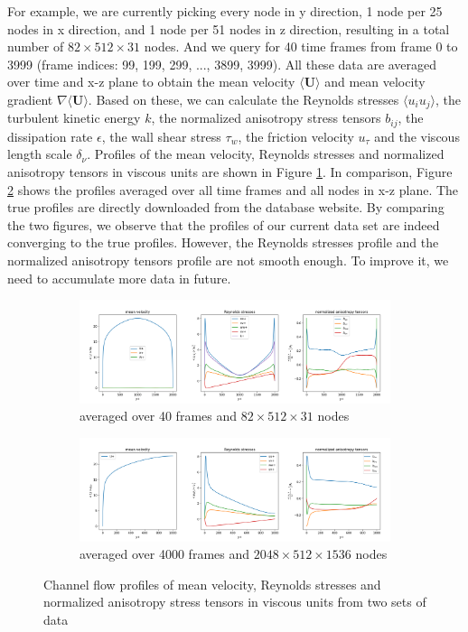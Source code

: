 \documentclass{article}
\numberwithin{equation}{section}
\begin{document}
For example, we are currently picking every node in y direction, 1 node per 25 nodes in x direction, and 1 node per 51 nodes in z direction, resulting in a total number of $82\times512\times31$ nodes. And we query for 40 time frames from frame 0 to 3999 (frame indices: 99, 199, 299, ..., 3899, 3999). All these data are averaged over time and x-z plane to obtain the mean velocity $\langle\mathbf{U}\rangle$ and mean velocity gradient $\nabla\langle\mathbf{U}\rangle$. Based on these, we can calculate the Reynolds stresses $\langle u_i u_j\rangle$, the turbulent kinetic energy $k$, the normalized anisotropy stress tensors $b_{ij}$, the dissipation rate $\epsilon$, the wall shear stress $\tau_w$, the friction velocity $u_{\tau}$ and the viscous length scale $\delta_{\nu}$. Profiles of the mean velocity, Reynolds stresses and normalized anisotropy tensors in viscous units are shown in Figure \ref{fig:profiles_40}. In comparison, Figure \ref{fig:profiles_all} shows the profiles averaged over all time frames and all nodes in x-z plane. The true profiles are directly downloaded from the database website. By comparing the two figures, we observe that the profiles of our current data set are indeed converging to the true profiles. However, the Reynolds stresses profile and the normalized anisotropy tensors profile are not smooth enough. To improve it, we need to accumulate more data in future. 


\begin{figure}[h]
    \centering
    \begin{subfigure}{1.0\textwidth}
        \centering
        \includegraphics[width=0.95\linewidth]{profiles_40frames.png}
        \caption{averaged over 40 frames and $82\times512\times31$ nodes}
        \label{fig:profiles_40}
    \end{subfigure}
    \begin{subfigure}{1.0\textwidth}
        \centering
        \includegraphics[width=0.95\linewidth]{profiles_entireDNS.png}
        \caption{averaged over 4000 frames and $2048\times512\times1536$ nodes}
        \label{fig:profiles_all}
    \end{subfigure}
    \caption{Channel flow profiles of mean velocity, Reynolds stresses and normalized anisotropy stress tensors in viscous units from two sets of data}
    \label{fig:profiles}
\end{figure}
\end{document}
